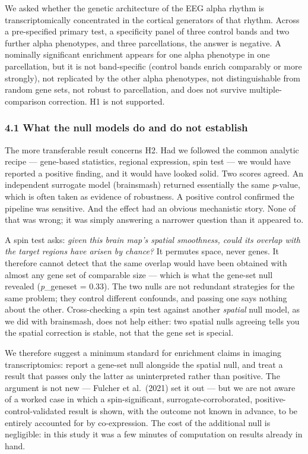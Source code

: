 \documentclass[
  11pt,
  letterpaper,
]{article}
\begin{document}
We asked whether the genetic architecture of the EEG alpha rhythm is
transcriptomically concentrated in the cortical generators of that
rhythm. Across a pre-specified primary test, a specificity panel of
three control bands and two further alpha phenotypes, and three
parcellations, the answer is negative. A nominally significant
enrichment appears for one alpha phenotype in one parcellation, but it
is not band-specific (control bands enrich comparably or more strongly),
not replicated by the other alpha phenotypes, not distinguishable from
random gene sets, not robust to parcellation, and does not survive
multiple-comparison correction. H1 is not supported.

\subsubsection{4.1 What the null models do and do not
establish}\label{what-the-null-models-do-and-do-not-establish}

The more transferable result concerns H2. Had we followed the common
analytic recipe --- gene-based statistics, regional expression, spin
test --- we would have reported a positive finding, and it would have
looked solid. Two scores agreed. An independent surrogate model
(brainsmash) returned essentially the same \emph{p}-value, which is
often taken as evidence of robustness. A positive control confirmed the
pipeline was sensitive. And the effect had an obvious mechanistic story.
None of that was wrong; it was simply answering a narrower question than
it appeared to.

A spin test asks: \emph{given this brain map's spatial smoothness, could
its overlap with the target regions have arisen by chance?} It permutes
space, never genes. It therefore cannot detect that the same overlap
would have been obtained with almost any gene set of comparable size ---
which is what the gene-set null revealed (\emph{p}\_geneset = 0.33). The
two nulls are not redundant strategies for the same problem; they
control different confounds, and passing one says nothing about the
other. Cross-checking a spin test against another \emph{spatial} null
model, as we did with brainsmash, does not help either: two spatial
nulls agreeing tells you the spatial correction is stable, not that the
gene set is special.

We therefore suggest a minimum standard for enrichment claims in imaging
transcriptomics: report a gene-set null alongside the spatial null, and
treat a result that passes only the latter as uninterpreted rather than
positive. The argument is not new --- Fulcher et al.~(2021) set it out
--- but we are not aware of a worked case in which a spin-significant,
surrogate-corroborated, positive-control-validated result is shown, with
the outcome not known in advance, to be entirely accounted for by
co-expression. The cost of the additional null is negligible: in this
study it was a few minutes of computation on results already in hand.
\end{document}
